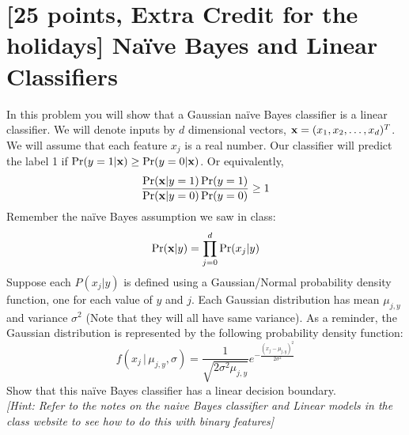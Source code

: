 \section{[25 points, Extra Credit for the holidays] Na\"ive Bayes and Linear Classifiers }
\label{sec:q1}


In this problem you will show that a Gaussian na\"ive Bayes classifier is a linear classifier. We will denote inputs by $d$ dimensional vectors, ${\bf x} = (x_1, x_2,\dots, x_d)^T$. We will assume that each feature $x_j$ is a real number. Our classifier will predict the label 1 if $\Pr(y=1|{\bf x}) \geq \Pr(y=0|{\bf x})$. Or equivalently,
\[
\frac{\Pr({\bf x} | y=1)\Pr(y=1)}{\Pr({\bf x} | y=0)\Pr(y=0)} \geq 1
\]
Remember the na\"ive Bayes assumption we saw in class:
\[
\Pr({\bf x}|y) = \prod_{j=0}^{d}\Pr(x_j|y)
\]
Suppose each $P(x_j|y)$ is defined using a Gaussian/Normal probability density function, one for each value of $y$ and $j$. Each Gaussian distribution has mean $\mu_{j,y}$ and variance $\sigma^2$ (Note that they will all have same variance). As a reminder, the Gaussian distribution is represented by the following probability density function:
\[
f(x_j\,|\,\mu_{j,y}, \sigma) = \frac{1}{\sqrt{2\sigma^2\mu_{j,y}}}e^{-\frac{(x_j-\mu_{j,y})^2}{2\sigma^2}}
\]
Show that this na\"ive Bayes classifier has a linear decision boundary.\\ \textit{[Hint: Refer to the notes on the naive Bayes classifier and Linear models in the class website to see how to do this with binary features]}


